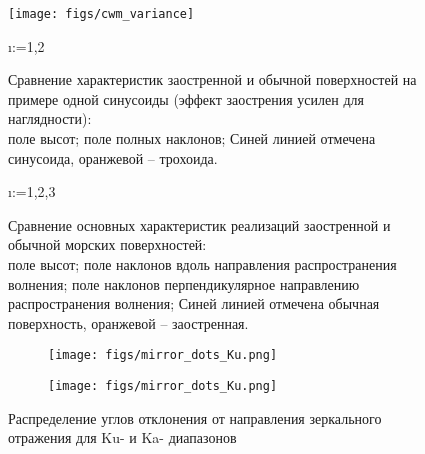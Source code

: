 \begin{figure}[h]
    \centering
    \texttt{[image: figs/cwm\_variance]}
    \caption{}
    \label{fig:}
\end{figure}


\begin{figure}[H]
\centering
\makeatletter
    \@for\i:={1,2}

\label{fig:cwm_demo}
\caption{
    Сравнение характеристик заостренной и обычной поверхностей на примере одной
    синусоиды (эффект заострения усилен для наглядности): \\
     поле высот;
     поле полных наклонов;
    Синей линией отмечена синусоида, оранжевой -- трохоида.
}
\makeatother
\end{figure}



\begin{figure}[H]
\centering
\makeatletter
    \@for\i:={1,2,3}

\label{fig:cwm_modeling}
\caption{
    Сравнение основных характеристик реализаций заостренной и обычной
    морских поверхностей: \\
     поле высот;
     поле наклонов вдоль направления
    распространения волнения;
     поле наклонов перпендикулярное направлению
    распространения волнения;
    Синей линией отмечена обычная поверхность, оранжевой -- заостренная.
}
\makeatother
\end{figure}

\begin{figure}
    \centering
    \begin{subfigure}{0.49\linewidth}
        \centering
        \texttt{[image: figs/mirror\_dots\_Ku.png]}
        \caption{}
        \label{subfig:mirror_dots_1}
    \end{subfigure}
    \begin{subfigure}{0.49\linewidth}
        \centering
        \texttt{[image: figs/mirror\_dots\_Ku.png]}
        \caption{}
        \label{subfig:mirror_dots_2}
    \end{subfigure}
    \caption{ Распределение углов отклонения от направления зеркального
    отражения для 
     Ku-  и 
     Ka- диапазонов}
\end{figure}


